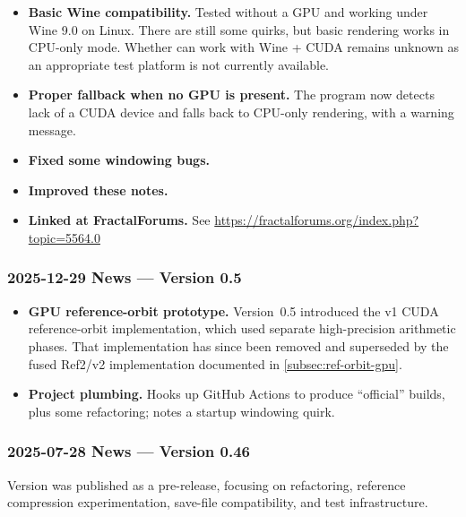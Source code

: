 \begin{itemize}
\item \textbf{Basic Wine compatibility.}  Tested without a GPU and working under
Wine 9.0 on Linux.   There are still some quirks, but basic rendering works in
CPU-only mode. Whether \FractalShark{} can work with Wine + CUDA remains unknown as
an appropriate test platform is not currently available.
\item \textbf{Proper fallback when no GPU is present.}  The program now detects lack of a CUDA
device and falls back to CPU-only rendering, with a warning message.
\item \textbf{Fixed some windowing bugs.}
\item \textbf{Improved these notes.}
\item \textbf{Linked at FractalForums.}  See \url{https://fractalforums.org/index.php?topic=5564.0}
\end{itemize}

\subsubsection{2025-12-29 News --- Version 0.5}
\begin{itemize}
  \item \textbf{GPU reference-orbit prototype.} Version~0.5 introduced the v1
  CUDA reference-orbit implementation, which used separate high-precision
  arithmetic phases.  That implementation has since been removed and
  superseded by the fused Ref2/v2 implementation documented in
  \cref{subsec:ref-orbit-gpu}.

  \item \textbf{Project plumbing.} Hooks up GitHub Actions to produce “official”
  builds, plus some refactoring; notes a startup windowing quirk.
\end{itemize}

\subsubsection{2025-07-28 News --- Version 0.46}

Version  was published as a pre-release, focusing on refactoring,
reference compression experimentation, save-file compatibility, and test infrastructure.

